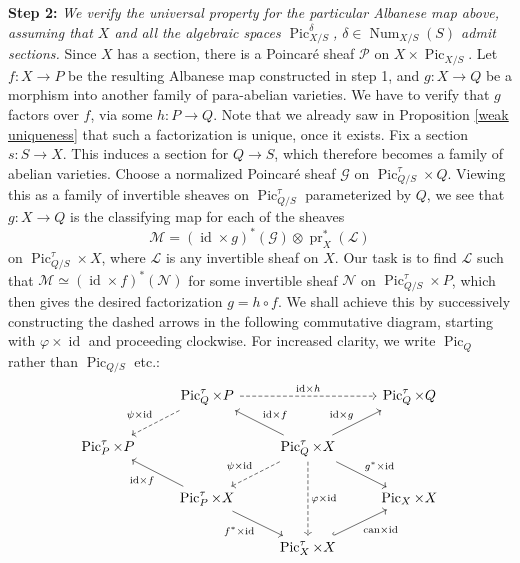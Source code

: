 \documentclass[oneside, 12pt]{amsart}
\theoremstyle{definition}
\theoremstyle{remark}
\newcommand{\shG}{\mathscr{G}}
\newcommand{\shM}{\mathscr{M}}
\newcommand{\shN}{\mathscr{N}}
\newcommand{\shL}{\mathscr{L}}
\newcommand{\shP}{\mathscr{P}}
\newcommand{\can}{\text{\rm  can}}
\newcommand{\id}{{\operatorname{id}}}
\newcommand{\Num}{\operatorname{Num}}
\newcommand{\Pic}{\operatorname{Pic}}
\newcommand{\pr}{\operatorname{pr}}
\newcommand{\ra}{\rightarrow}
\begin{document}
\medskip
{\bf Step 2:}
\emph{We verify the universal property for the particular Albanese map above,
assuming that $X$ and all the algebraic spaces  $\Pic^\delta_{X/S}$, $\delta\in\Num_{X/S}(S)$ admit sections.}
Since $X$ has a section, there is   a  Poincar\'e sheaf $\shP$ on $X\times\Pic_{X/S}$. Let $f:X\ra P$ be the resulting Albanese map constructed in step 1,
and $g:X\ra Q$ be a morphism into another family of para-abelian varieties. We have to verify that $g$ factors over $f$, via some  $h:P\ra Q$.
Note that we already saw in Proposition \ref{weak uniqueness} that such a factorization is unique, once it exists.
Fix a section $s:S\ra X$. This induces a section for $Q\ra S$, which therefore becomes
a family of abelian varieties. Choose a normalized Poincar\'e sheaf $\shG$ on $\Pic^\tau_{Q/S}\times Q$.
Viewing this as a family of invertible sheaves on $\Pic^\tau_{Q/S}$ parameterized by $Q$, we see that
 $g:X\ra Q$ is the classifying map for each of the sheaves
\begin{equation}
\label{pullback poincare}
\shM=(\id\times g)^*(\shG)\otimes\pr_X^*(\shL)
\end{equation}
on $\Pic^\tau_{Q/S}\times X$, where $\shL$ is any invertible sheaf on $X$.
Our task is to find  $\shL$ such that   $\shM\simeq (\id\times f)^*(\shN)$ for some
invertible sheaf $\shN$ on $\Pic^\tau_{Q/S}\times P$, which then gives  the desired factorization $g=h\circ f$. 
We shall achieve this  by successively constructing the
dashed arrows in the following commutative diagram, starting with $\varphi\times\id$ and proceeding clockwise.
For increased clarity, we write $\Pic_Q$ rather than $\Pic_{Q/S}$  etc.:
\begin{equation}
\label{diamond diagram}
\begin{tikzcd}[]
                            & \Pic^\tau_Q\times P\arrow[dl,dashed,"\psi\times \id"']\arrow[rr,dashed,"\id\times h"]      &                           & \Pic^\tau_Q\times Q\\
\Pic^\tau_P\times P     &                               & \Pic^\tau_Q\times X\arrow[ur,"\id\times g"]\arrow[dr,"g^*\times \id"]\arrow[ul,"\id\times f"']\arrow[dd,dashed,"\varphi\times\id"]\arrow[dl,dashed,"\psi\times\id"']\\
                            & \Pic^\tau_P\times X\arrow[ul,"\id\times f"]\ar[dr,"f^*\times\id"']         &  & \Pic_X\times X \\
                            &                                                                               & \Pic^\tau_X\times X \ar[ru,hook,"\can\times\id"']
\end{tikzcd}	 
\end{equation} 
\end{document}
